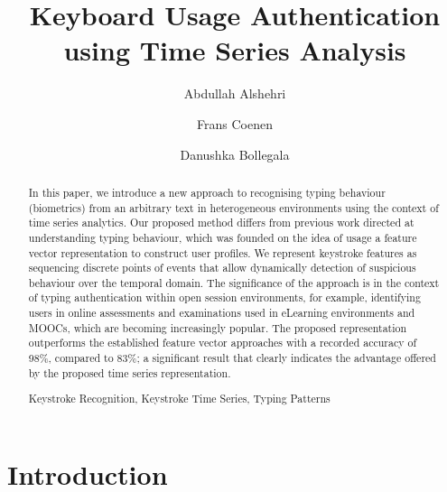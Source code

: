 \documentclass[runningheads,a4paper]{llncs}
\newcommand{\keywords}[1]{\par\addvspace\baselineskip
\noindent\keywordname\enspace\ignorespaces#1}
\begin{document}
\mainmatter  %

\title{Keyboard Usage Authentication using Time Series Analysis} %


\author{Abdullah Alshehri
\and Frans Coenen
\and Danushka Bollegala}

\maketitle

\begin{abstract}

In this paper, we introduce a new approach to recognising typing behaviour (biometrics) from an arbitrary text in heterogeneous environments using the context of time series analytics. Our proposed method differs from previous work directed at understanding typing behaviour, which was founded on the idea of usage a feature vector representation to construct user profiles. We represent keystroke features as sequencing discrete points of events that allow dynamically detection of suspicious behaviour over the temporal domain. The significance of the approach is in the context of typing authentication within open session environments, for example, identifying users in online assessments and examinations used in eLearning environments and MOOCs, which are becoming increasingly popular. The proposed representation outperforms the established feature vector approaches with a recorded accuracy of 98\%, compared to 83\%; a significant result that clearly indicates the advantage offered by the proposed time series representation.


\keywords {Keystroke Recognition, Keystroke Time Series, Typing Patterns}
\end{abstract}

\section{Introduction} \label{sec:introduction}
\end{document}
